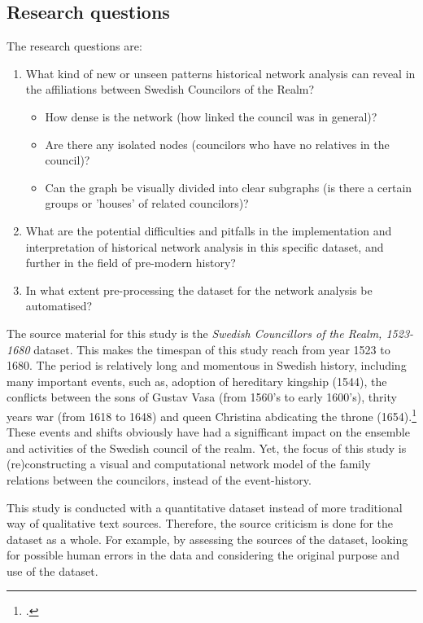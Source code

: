 \documentclass[a4paper,12pt]{article}
\begin{document}
\begin{onehalfspace}
\subsection{Research questions}
The research questions are:
\begin{enumerate}
	\item What kind of new or unseen patterns historical network analysis can reveal in the affiliations between Swedish Councilors of the Realm? \begin{itemize}
		\item How dense is the network (how linked the council was in general)?
		\item Are there any isolated nodes (councilors who have no relatives in the council)?
		\item Can the graph be visually divided into clear subgraphs (is there a certain groups or 'houses' of related councilors)?
	\end{itemize}	
	\item What are the potential difficulties and pitfalls in the implementation and interpretation of historical network analysis in this specific dataset, and further in the field of pre-modern history?
	\item In what extent pre-processing the dataset for the network analysis be automatised?
\end{enumerate} 

The source material for this study is the \textit{Swedish Councillors of the Realm, 1523-1680} dataset. This makes the timespan of this study reach from year 1523 to 1680. The period is relatively long and momentous in Swedish history, including many important events, such as, adoption of hereditary kingship (1544), the conflicts between the sons of Gustav Vasa (from 1560's to early 1600's), thrity years war (from 1618 to 1648) and queen Christina abdicating the throne (1654).\footcite[p. 8-9.]{personalAgency} These events and shifts obviously have had a signifficant impact on the ensemble and activities of the Swedish council of the realm. Yet, the focus of this study is (re)constructing a visual and computational network model of the family relations between the councilors, instead of the event-history. 

This study is conducted with a quantitative dataset instead of more traditional way of qualitative text sources. Therefore, the source criticism is done for the dataset as a whole. For example, by assessing the sources of the dataset, looking for possible human errors in the data and considering the original purpose and use of the dataset. 


\end{onehalfspace}
\end{document}
